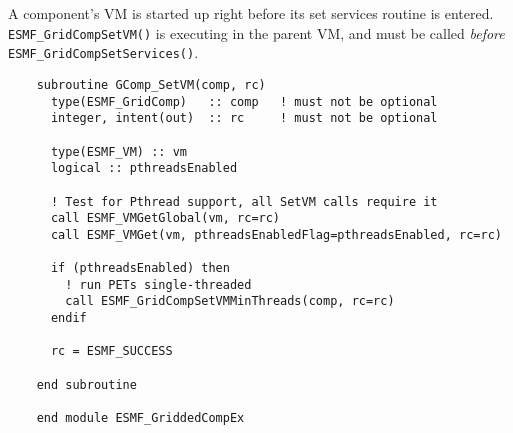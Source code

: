    A component's VM is started up right before its set services routine is
   entered. {\tt ESMF\_GridCompSetVM()} is executing in the parent VM, and must
   be called {\em before} {\tt ESMF\_GridCompSetServices()}. 

 \begin{verbatim}
    subroutine GComp_SetVM(comp, rc)
      type(ESMF_GridComp)   :: comp   ! must not be optional
      integer, intent(out)  :: rc     ! must not be optional
      
      type(ESMF_VM) :: vm
      logical :: pthreadsEnabled
      
      ! Test for Pthread support, all SetVM calls require it
      call ESMF_VMGetGlobal(vm, rc=rc)
      call ESMF_VMGet(vm, pthreadsEnabledFlag=pthreadsEnabled, rc=rc)

      if (pthreadsEnabled) then
        ! run PETs single-threaded
        call ESMF_GridCompSetVMMinThreads(comp, rc=rc)
      endif

      rc = ESMF_SUCCESS

    end subroutine

    end module ESMF_GriddedCompEx
 
\end{verbatim}

\setlength{\parskip}{\oldparskip}
\setlength{\parindent}{\oldparindent}
\setlength{\baselineskip}{\oldbaselineskip}
